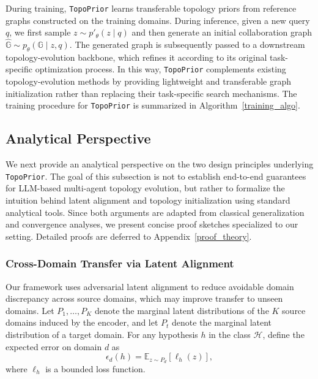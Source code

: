 \documentclass[lettersize,journal]{IEEEtran}
\theoremstyle{plain}
\begin{document}
During training, \texttt{TopoPrior} learns transferable topology priors from reference graphs constructed on the training domains. During inference, given a new query $q$, we first sample $z\sim p'_\theta(z\mid q)$ and then generate an initial collaboration graph $\hat{\mathbb{G}}\sim p_\theta(\mathbb{G}\mid z,q)$. The generated graph is subsequently passed to a downstream topology-evolution backbone, which refines it according to its original task-specific optimization process. In this way, \texttt{TopoPrior} complements existing topology-evolution methods by providing lightweight and transferable graph initialization rather than replacing their task-specific search mechanisms. The training procedure for \texttt{TopoPrior} is summarized in Algorithm~\ref{training_algo}.



\subsection{Analytical Perspective}
\label{sec:theory}
We next provide an analytical perspective on the two design principles underlying \texttt{TopoPrior}. The goal of this subsection is not to establish end-to-end guarantees for LLM-based multi-agent topology evolution, but rather to formalize the intuition behind latent alignment and topology initialization using standard analytical tools. Since both arguments are adapted from classical generalization and convergence analyses, we present concise proof sketches specialized to our setting. Detailed proofs are deferred to Appendix~\ref{proof_theory}.

\subsubsection{Cross-Domain Transfer via Latent Alignment}
\label{subsec:multidomain}
Our framework uses adversarial latent alignment to reduce avoidable domain discrepancy across source domains, which may improve transfer to unseen domains. Let $P_1,\dots,P_K$ denote the marginal latent distributions of the $K$ source domains induced by the encoder, and let $P_t$ denote the marginal latent distribution of a target domain. For any hypothesis $h$ in the class $\mathcal{H}$, define the expected error on domain $d$ as
\begin{equation}
\epsilon_d(h)=\mathbb{E}_{z\sim P_d}[\ell_h(z)],
\end{equation}
where $\ell_h$ is a bounded loss function.
\end{document}
